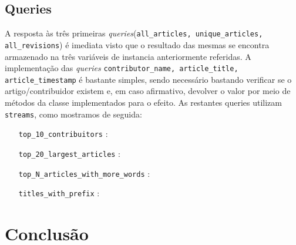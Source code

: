 \documentclass[a4paper,11pt]{article}
\begin{document}
\subsection{Queries}
A resposta às três primeiras \textit{queries}(\texttt{all\_articles, unique\_articles, all\_revisions}) é imediata visto que o resultado das mesmas se encontra armazenado na três variáveis de instancia anteriormente referidas. A implementação das \textit{queries} \texttt{contributor\_name, article\_title, article\_timestamp} é bastante simples, sendo necessário bastando verificar se o artigo/contribuidor existem e, em caso afirmativo, devolver o valor por meio de métodos da classe implementados para o efeito. As restantes queries utilizam \texttt{streams}, como mostramos de seguida:
\begin{itemize}[align=left]
\item[\texttt{top\_10\_contribuitors}] :
\item[\texttt{top\_20\_largest\_articles}] :
\item[\texttt{top\_N\_articles\_with\_more\_words}] :
\item[\texttt{titles\_with\_prefix}] :
\end{itemize}

\newpage

\section{Conclusão}
\end{document}
